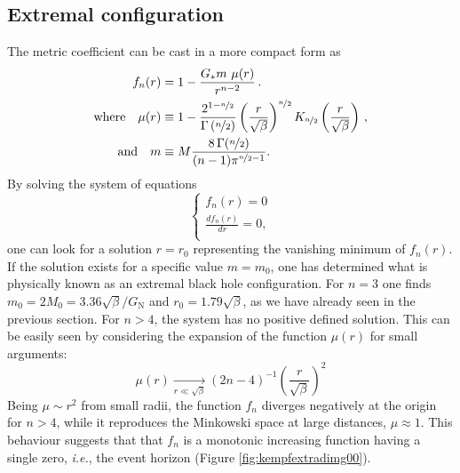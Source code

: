 \subsection{Extremal configuration}
The metric coefficient can be cast in a  more compact form as
\begin{align}
f_n(r) &=1- \frac{G_\ast m\ \mu(r)}{r^{n-2}}
\,.
\\
\text{where}\quad
\mu(r) &\equiv  1 - \frac{2^{1-\nicefrac{n}{2}}}
{\Gamma\left(\nicefrac{n}{2}\right)}
\left( \frac r{\sqrt{\beta}} \right)^{\nicefrac{n}{2}}
K_{\nicefrac{n}{2}}\left( \frac{r}{\sqrt{\beta}} 
\right)
\,,
\\
\text{and}\quad
m &\equiv M \frac{8  \, \Gamma(\nicefrac{n}{2})}{(n-1)\pi^{\nicefrac{n}{2}-1}}.
\end{align}
By solving the system of equations
\begin{equation}
\begin{cases} 
f_n(r)=0\\ \frac{df_n(r)}{dr}=0,\\ 
\end{cases} 
\end{equation}
one can look for a solution $r=r_0$ representing the vanishing minimum of
$f_n(r)$. If the solution exists for a specific value $m=m_0$, one has 
determined what is physically known as an extremal black hole configuration.
For $n=3$ one finds $m_0=2M_0=3.36 \sqrt{\beta}/G_\mathrm{N}$ and
$r_0=1.79\sqrt{\beta}$, as we have already seen in the previous section.
For $n>4$, the system has no positive defined solution. This can be easily
seen by considering the expansion of the function $\mu(r)$ for small arguments:
\begin{equation}
\mu(r) \xrightarrow[r \ll \sqrt{\beta}]{}
(2n-4)^{-1}
\left( \frac r{\sqrt{\beta}} \right)^{2}
\label{eq:muexpansion}
\end{equation}
Being $\mu\sim r^2$ from small radii,  the function $f_n$ diverges negatively
at the origin for $n>4$, while it reproduces the Minkowski space at large
distances, $\mu\approx 1$. This behaviour suggests that that $f_n$ is a
monotonic increasing function having a single zero, \textit{i.e.}, the
event horizon (Figure \ref{fig:kempfextradimg00}).

